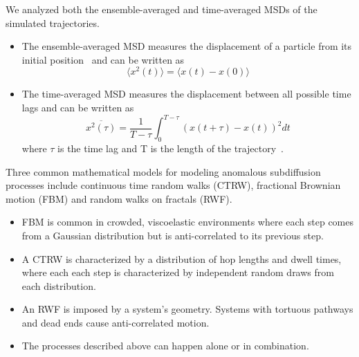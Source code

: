\documentclass{article}
\begin{document}
  \noindent We analyzed both the ensemble-averaged and time-averaged MSDs
  of the simulated trajectories.
  \begin{itemize}
	\item The ensemble-averaged MSD measures the displacement of a particle from its initial
	position~\cite{meroz_toolbox_2015} and can be written as
	\begin{equation}
	\langle x^2(t) \rangle = \langle x(t) - x(0) \rangle
	\label{eqn:ensemble_msd}
	\end{equation}
	\item The time-averaged MSD measures the displacement between all possible time lags
	and can be written as
	\begin{equation}
	\overline{x^2(\tau)} = \dfrac{1}{T - \tau}\int_{0}^{T - \tau} (x(t + \tau) - x(t))^2 dt
	\end{equation}
	where $\tau$ is the time lag and T is the length of the
	trajectory~\cite{meroz_toolbox_2015}. 
  \end{itemize}
  
  \noindent Three common mathematical models for modeling anomalous subdiffusion
  processes include continuous time random walks (CTRW), fractional Brownian motion
  (FBM) and random walks on fractals (RWF).\cite{meroz_toolbox_2015}
  \begin{itemize}
    \item FBM is common in crowded, viscoelastic environments where each step comes 
    from a Gaussian distribution but is anti-correlated to its previous 
    step.~\cite{mandelbrot_fractional_1968,jeon_fractional_2010,banks_anomalous_2005}
    \item A CTRW is characterized by a distribution of hop lengths and 
    dwell times, where each each step is characterized by independent random draws from 
    each distribution.\cite{montroll_random_1965,morrin_three_2018}
    \item An RWF is imposed by a system's geometry. Systems with tortuous pathways and dead
    ends cause anti-correlated motion.\cite{meroz_toolbox_2015,neusius_subdiffusion_2008}
    \item The processes described above can happen alone or in combination.  	
  \end{itemize}
  
\end{document}
